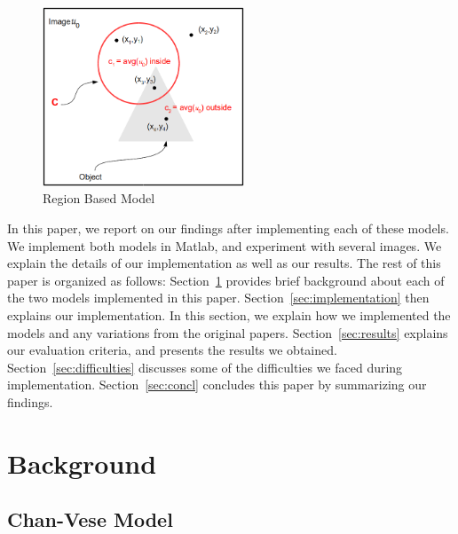 \documentclass[10pt,twocolumn,letterpaper]{article}
\begin{document}
\begin{figure}[t]
\centering
\includegraphics[width=6cm]{explaining.png}
\caption{Region Based Model}
\label{fig:region}
\end{figure}

In this paper, we report on our findings after implementing each of these models. We implement both models in Matlab, and experiment with several images.
We explain the details of our implementation as well as our results. The rest of this paper is organized as follows:
Section~\ref{sec:bg} provides brief background about each of the two models implemented in this paper. Section~\ref{sec:implementation} then explains our
implementation. In this section, we explain how we implemented the models and any variations from the original papers. Section~\ref{sec:results} explains our
evaluation criteria, and
presents the results we obtained. Section~\ref{sec:difficulties} discusses some of the difficulties we faced during implementation. Section~\ref{sec:concl}
concludes this paper by summarizing our findings.

\section{Background}
\label{sec:bg}


\subsection{Chan-Vese Model}
\label{sec:chan-vese}
\end{document}
